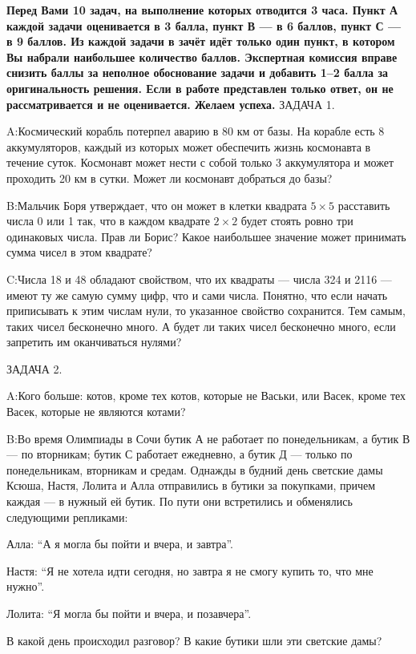 \documentclass[10pt]{scrbook} \usepackage{modules/nonstahp_book}
\begin{document}
\medbreak
\noindent
{\bf Перед Вами 10 задач, на выполнение которых отводится 3 часа. Пункт А каждой задачи оценивается в 3 балла, пункт В --- в 6 баллов, пункт С --- в  9 баллов. Из каждой задачи в зачёт идёт только один пункт, в котором Вы набрали наибольшее количество баллов. Экспертная комиссия вправе снизить баллы за неполное обоснование задачи и добавить 1--2 балла за оригинальность решения. Если в работе представлен только ответ, он не рассматривается и не оценивается. Желаем успеха.}
\medbreak
\noindent
ЗАДАЧА 1.

 A:\qquad Космический корабль потерпел аварию в 80 км от базы. На корабле есть 8 аккумуляторов, каждый из которых может обеспечить жизнь космонавта в течение суток. Космонавт может нести с собой только 3 аккумулятора и может проходить 20 км в сутки. Может ли космонавт добраться до базы?

 B:\qquad Мальчик Боря утверждает, что он может в клетки квадрата $5\times 5$ расставить числа 0 или 1 так, что в каждом квадрате $2\times 2$ будет стоять ровно три одинаковых числа. Прав ли Борис? Какое наибольшее значение может принимать сумма чисел в этом квадрате?

 C:\qquad Числа 18 и 48 обладают свойством, что их квадраты --- числа 324 и 2116 --- имеют ту же самую сумму цифр, что и сами числа. Понятно, что если начать приписывать к этим числам нули, то указанное свойство сохранится. Тем самым, таких чисел бесконечно много. А будет ли таких чисел бесконечно много, если запретить им оканчиваться нулями?

\medbreak
\noindent
ЗАДАЧА 2.

A:\qquad  Кого больше: котов, кроме тех котов, которые не Васьки, или Васек, кроме тех Васек, которые не являются котами?


B:\quad Во время Олимпиады в Сочи бутик А не работает по понедельникам, а бутик В --- по вторникам; бутик С работает ежедневно, а бутик Д --- только по понедельникам, вторникам и средам. Однажды в будний день светские дамы  Ксюша, Настя, Лолита и Алла отправились в бутики за покупками, причем каждая --- в нужный ей бутик. По пути они встретились и обменялись следующими репликами:

Алла: ``А я могла бы пойти и вчера, и завтра''.\par
Настя: ``Я не хотела идти сегодня, но завтра я не смогу купить то, что мне нужно''.\par
Лолита: ``Я могла бы пойти и вчера, и позавчера''.

\noindent
В какой день происходил разговор? В какие бутики шли эти светские дамы?
\end{document}
